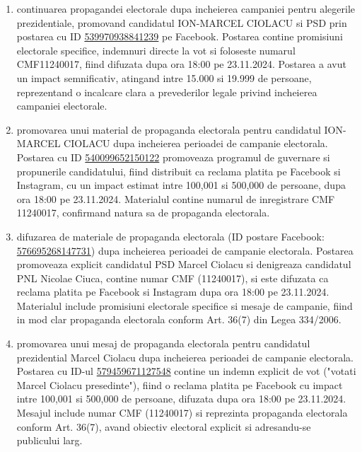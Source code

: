 \documentclass[a4paper,12pt]{article}
\begin{document}
\begin{enumerate}[leftmargin=*, label=\arabic*.)]
    \item continuarea propagandei electorale dupa incheierea campaniei pentru alegerile prezidentiale, promovand candidatul ION-MARCEL CIOLACU si PSD prin postarea cu ID \href{https://www.facebook.com/ads/library/?id=539970938841239}{539970938841239} pe Facebook. Postarea contine promisiuni electorale specifice, indemnuri directe la vot si foloseste numarul CMF11240017, fiind difuzata dupa ora 18:00 pe 23.11.2024. Postarea a avut un impact semnificativ, atingand intre 15.000 si 19.999 de persoane, reprezentand o incalcare clara a prevederilor legale privind incheierea campaniei electorale.
    \item promovarea unui material de propaganda electorala pentru candidatul ION-MARCEL CIOLACU dupa incheierea perioadei de campanie electorala. Postarea cu ID \href{https://www.facebook.com/ads/library/?id=540099652150122}{540099652150122} promoveaza programul de guvernare si propunerile candidatului, fiind distribuit ca reclama platita pe Facebook si Instagram, cu un impact estimat intre 100,001 si 500,000 de persoane, dupa ora 18:00 pe 23.11.2024. Materialul contine numarul de inregistrare CMF 11240017, confirmand natura sa de propaganda electorala.
    \item difuzarea de materiale de propaganda electorala (ID postare Facebook: \href{https://www.facebook.com/ads/library/?id=576695268147731}{576695268147731}) dupa incheierea perioadei de campanie electorala. Postarea promoveaza explicit candidatul PSD Marcel Ciolacu si denigreaza candidatul PNL Nicolae Ciuca, contine numar CMF (11240017), si este difuzata ca reclama platita pe Facebook si Instagram dupa ora 18:00 pe 23.11.2024. Materialul include promisiuni electorale specifice si mesaje de campanie, fiind in mod clar propaganda electorala conform Art. 36(7) din Legea 334/2006.
    \item promovarea unui mesaj de propaganda electorala pentru candidatul prezidential Marcel Ciolacu dupa incheierea perioadei de campanie electorala. Postarea cu ID-ul \href{https://www.facebook.com/ads/library/?id=579459671127548}{579459671127548} contine un indemn explicit de vot ("votati Marcel Ciolacu presedinte"), fiind o reclama platita pe Facebook cu impact intre 100,001 si 500,000 de persoane, difuzata dupa ora 18:00 pe 23.11.2024. Mesajul include numar CMF (11240017) si reprezinta propaganda electorala conform Art. 36(7), avand obiectiv electoral explicit si adresandu-se publicului larg.

\end{enumerate}
\end{document}
